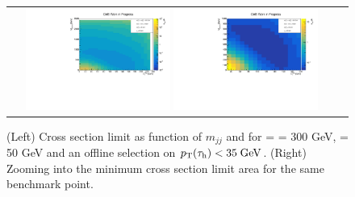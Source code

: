 \begin{figure}[tbh!]
	\centering
	\begin{tabular}{cc}
		\includegraphics[width=0.45\textwidth]{analysis/pics/JetInvMass_vs_MET_xsec_chi300_lsp050_taupt35.pdf}
		\includegraphics[width=0.45\textwidth]{analysis/pics/JetInvMass_vs_MET_xsec_chi300_lsp050_taupt35_zoom.pdf}
	\end{tabular}
	\caption{(Left) Cross section limit as function of $m_{jj}$ and \met for \charginopm = \neutralinotwo = 300 GeV, \neutralinoone = 50 GeV and an offline selection on $p_{\text{T}}(\tau_{\text{h}}) <  35\;\text{Ge}\kern-0.06667em\text{V}$. (Right) Zooming into the minimum cross section limit area for the same benchmark point.}
	\label{fig::JetInvMass_vs_MET_xsec_chi300_lsp050_taupt35}
\end{figure}

